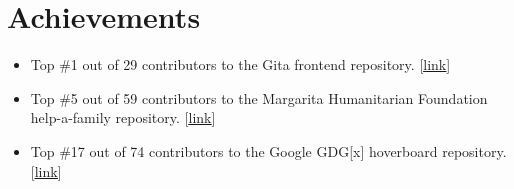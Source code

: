 \documentclass[letterpaper,11pt]{article}
\newcommand{\resumeItem}[1]{
  \item\small{
    {#1 \vspace{-2pt}}
  }
}
\newcommand{\resumeItemListStart}{\begin{itemize}}
\newcommand{\resumeItemListEnd}{\end{itemize}\vspace{-5pt}}
\begin{document}
\section{Achievements}
  \resumeItemListStart
      \resumeItem{Top \#1 out of 29 contributors to the Gita frontend repository. [\href {https://github.com/gita/bg-frontend/graphs/contributors} {\underline{link}}]}
      \vspace{-4pt}
      \resumeItem{Top \#5 out of 59 contributors to the Margarita Humanitarian Foundation help-a-family repository. [\href {https://github.com/margaritahumanitarian/helpafamily/graphs/contributors} {\underline{link}}]}
      \vspace{-4pt}
      \resumeItem{Top \#17 out of 74 contributors to the Google GDG[x] hoverboard repository. [\href {https://github.com/gdg-x/hoverboard/graphs/contributors} {\underline{link}}]}
      \vspace{-4pt}
  \resumeItemListEnd
\end{document}

